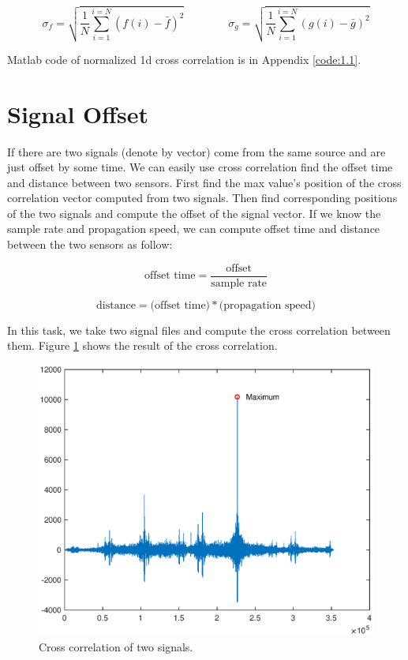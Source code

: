 \begin{equation*}
{\sigma _{f}}=
\sqrt{\frac{1}{N}\sum_{i=1}^{i=N}(f(i)-\bar{f})^{2}}
\hspace{4em}
{\sigma _{g}}=
\sqrt{\frac{1}{N}\sum_{i=1}^{i=N}(g(i)-\bar{g})^{2}}
\end{equation*}

Matlab code of normalized 1d cross correlation is in Appendix \ref{code:1.1}.


\section{Signal Offset}

If there are two signals (denote by vector) come from the same source and are just offset by some time. We can easily use cross correlation find the offset time and distance between two sensors. First find the max value's position of the cross correlation vector computed from two signals. Then find corresponding positions of the two signals and compute the offset of the signal vector. If we know the sample rate and propagation speed, we can compute offset time and distance between the two sensors as follow:

\begin{equation*}
\text{offset time}=\frac{\text{offset}}{\text{sample rate}} 
\end{equation*}

\begin{equation*}
\text{distance}=\text{(offset time)} * \text{(propagation speed)}
\end{equation*}

In this task, we take two signal files and compute the cross correlation between them. Figure \ref{fig:crr_vis0} shows the result of the cross correlation.

\begin{figure}[h!]
	\centering
		\includegraphics[width=0.50\linewidth]{figures/part1/crr_vis0.eps}
		\caption{Cross correlation of two signals.}
		\label{fig:crr_vis0}
\end{figure} 

